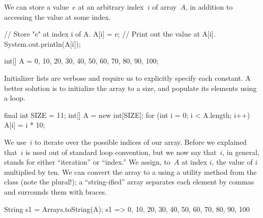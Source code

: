 We can store a value~$e$ at an arbitrary index~$i$ of array~$A$, in addition to accessing the value at some index.

\begin{verbnobox}[\small]
// Store "e" at index i of A.
A[i] = e;
// Print out the value at A[i].
System.out.println(A[i]);
\end{verbnobox}

\begin{verbnobox}[\small]
int[] A = {0, 10, 20, 30, 40, 50, 60, 70, 80, 90, 100};
\end{verbnobox}

Initializer lists are verbose and require us to explicitly specify each constant. 
A better solution is to initialize the array to a size, and populate its elements using a loop.

\begin{verbnobox}[\small]
final int SIZE = 11;
int[] A = new int[SIZE];
for (int i = 0; i < A.length; i++) { A[i] = i * 10; }
\end{verbnobox}

We use~$i$ to iterate over the possible indices of our array. 
Before we explained that~$i$ is used out of standard loop convention, but we now say that~$i$, in general, stands for either ``iteration'' or ``index.'' 
We assign, to~$A$ at index $i$, the value of $i$ multiplied by ten. 
We can convert the array to a  using a utility method from the  class (note the plural!); a ``string-ified'' array separates each element by commas and surrounds them with braces.

\begin{verbnobox}[\small]
String s1 = Arrays.toString(A);
s1 => {0, 10, 20, 30, 40, 50, 60, 70, 80, 90, 100}
\end{verbnobox}

